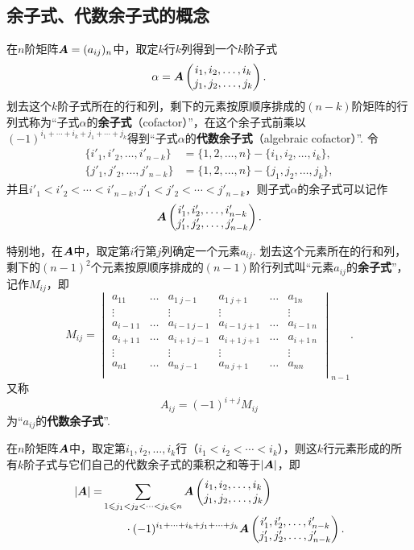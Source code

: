 \subsection{余子式、代数余子式的概念}
\begin{definition}
在\(n\)阶矩阵\(\boldsymbol{A}=(a_{ij})_n\)中，取定\(k\)行\(k\)列得到一个\(k\)阶子式\[
\alpha = \boldsymbol{A}\begin{pmatrix}
i_1,i_2,\dotsc,i_k \\
j_1,j_2,\dotsc,j_k
\end{pmatrix}.
\]划去这个\(k\)阶子式所在的行和列，剩下的元素按原顺序排成的\((n-k)\)阶矩阵的行列式称为“子式\(\alpha\)的\textbf{余子式}（cofactor）”，在这个余子式前乘以\((-1)^{i_1+\dotsb+i_k+j_1+\dotsb+j_k}\)得到“子式\(\alpha\)的\textbf{代数余子式}（algebraic cofactor）”.
令\[\begin{split}
\{i'_1,i'_2,\dotsc,i'_{n-k}\} &= \{1,2,\dotsc,n\}-\{i_1,i_2,\dotsc,i_k\}, \\
\{j'_1,j'_2,\dotsc,j'_{n-k}\} &= \{1,2,\dotsc,n\}-\{j_1,j_2,\dotsc,j_k\},
\end{split}\]并且\(i'_1<i'_2<\dotsb<i'_{n-k},%
j'_1<j'_2<\dotsb<j'_{n-k}\)，则子式\(\alpha\)的余子式可以记作\[
\boldsymbol{A}\begin{pmatrix}
i'_1,i'_2,\dotsc,i'_{n-k} \\
j'_1,j'_2,\dotsc,j'_{n-k}
\end{pmatrix}.
\]

特别地，在\(\boldsymbol{A}\)中，取定第\(i\)行第\(j\)列确定一个元素\(a_{ij}\).
划去这个元素所在的行和列，剩下的\((n-1)^2\)个元素按原顺序排成的\((n-1)\)阶行列式叫“元素\(a_{ij}\)的\textbf{余子式}”，记作\(M_{ij}\)，即\[
M_{ij} = \begin{vmatrix}
a_{11} & \dots & a_{1\ j-1} & a_{1\ j+1} & \dots & a_{1n} \\
\vdots & & \vdots & \vdots & & \vdots \\
a_{i-1\ 1} & \dots & a_{i-1\ j-1} & a_{i-1\ j+1} & \dots & a_{i-1\ n} \\
a_{i+1\ 1} & \dots & a_{i+1\ j-1} & a_{i+1\ j+1} & \dots & a_{i+1\ n} \\
\vdots & & \vdots & \vdots & & \vdots \\
a_{n1} & \dots & a_{n\ j-1} & a_{n\ j+1} & \dots & a_{nn} \\
\end{vmatrix}_{n-1}.
\]又称\[
A_{ij}=(-1)^{i+j} M_{ij}
\]为“\(a_{ij}\)的\textbf{代数余子式}”.
\end{definition}

\begin{theorem}[Laplace定理]%
在\(n\)阶矩阵\(\boldsymbol{A}\)中，取定第\(i_1,i_2,\dotsc,i_k\)行（\(i_1<i_2<\dotsb<i_k\)），则这\(k\)行元素形成的所有\(k\)阶子式与它们自己的代数余子式的乘积之和等于\(\abs{\boldsymbol{A}}\)，即\begin{equation}
\begin{split}
\abs{\boldsymbol{A}} = &\sum\limits_{1 \leqslant j_1 < j_2 < \dotsb < j_k \leqslant n}
\boldsymbol{A}\begin{pmatrix}
i_1,i_2,\dotsc,i_k \\
j_1,j_2,\dotsc,j_k
\end{pmatrix} \\
&\hspace{20pt}
\cdot(-1)^{i_1+\dotsb+i_k+j_1+\dotsb+j_k}
\boldsymbol{A}\begin{pmatrix}
i'_1,i'_2,\dotsc,i'_{n-k} \\
j'_1,j'_2,\dotsc,j'_{n-k}
\end{pmatrix}.
\end{split}
\end{equation}
\end{theorem}

